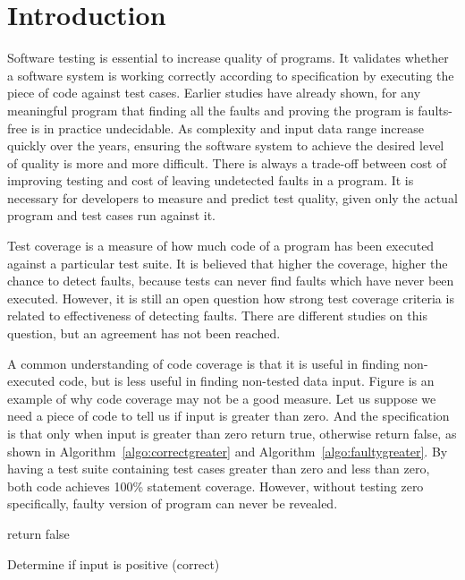 \section{Introduction}
Software testing is essential to increase quality of programs. It validates whether a software system is working correctly according to specification by executing the piece of code against test cases. Earlier studies have already shown, for any meaningful program that finding all the faults and proving the program is faults-free is in practice undecidable. As complexity and input data range increase quickly over the years, ensuring the software system to achieve the desired level of quality is more and more difficult. There is always a trade-off between cost of improving testing and cost of leaving undetected faults in a program. It is necessary for developers to measure and predict test quality, given only the actual program and test cases run against it.

Test coverage is a measure of how much code of a program has been executed against a particular test suite. It is believed that higher the coverage, higher the chance to detect faults, because tests can never find faults which have never been executed. However, it is still an open question how strong test coverage criteria is related to effectiveness of detecting faults. There are different studies on this question, but an agreement has not been reached.

A common understanding of code coverage is that it is useful in finding non-executed code, but is less useful in finding non-tested data input. Figure is an example of why code coverage may not be a good measure. Let us suppose we need a piece of code to tell us if input is greater than zero. And the specification is that only when input is greater than zero return true, otherwise return false, as shown in Algorithm~\ref{algo:correctgreater} and Algorithm~\ref{algo:faultygreater}. By having a test suite containing test cases greater than zero and less than zero, both code achieves 100\% statement coverage. However, without testing zero specifically, faulty version of program can never be revealed.

\begin{algorithm}[h]	
	{	return false\;
	}
	\caption{Determine if input is positive (correct)}
	\label{algo:correctgreater}
	\bigskip
\end{algorithm}

